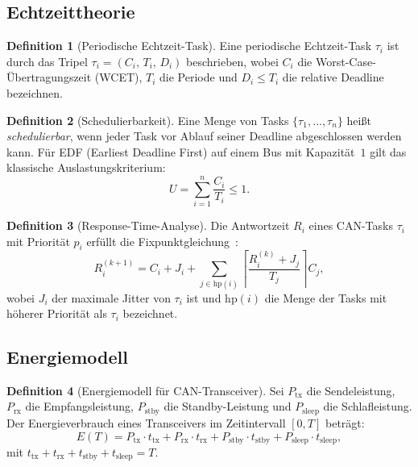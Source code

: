 ﻿\documentclass[a4paper,12pt]{article}
\theoremstyle{definition}
\newtheorem{definition}{Definition}
\begin{document}
\subsection{Echtzeittheorie}

\begin{definition}[Periodische Echtzeit-Task]
Eine periodische Echtzeit-Task $\tau_i$ ist durch das Tripel
$\tau_i = (C_i,\, T_i,\, D_i)$ beschrieben, wobei
$C_i$ die Worst-Case-\"{U}bertragungszeit (WCET),
$T_i$ die Periode und
$D_i \leq T_i$ die relative Deadline bezeichnen.
\end{definition}

\begin{definition}[Schedulierbarkeit]
Eine Menge von Tasks $\{\tau_1, \ldots, \tau_n\}$ hei\ss{}t \emph{schedulierbar},
wenn jeder Task vor Ablauf seiner Deadline abgeschlossen werden kann.
F\"{u}r EDF (Earliest Deadline First) auf einem Bus mit Kapazit\"{a}t~$1$ gilt
das klassische Auslastungskriterium:
\[
    U = \sum_{i=1}^{n} \frac{C_i}{T_i} \leq 1.
\]
\end{definition}

\begin{definition}[Response-Time-Analyse]
Die Antwortzeit $R_i$ eines CAN-Tasks $\tau_i$ mit Priorit\"{a}t $p_i$ erf\"{u}llt die
Fixpunktgleichung~\cite{tindell_can}:
\[
    R_i^{(k+1)}
    = C_i + J_i
      + \sum_{j \in \mathrm{hp}(i)}
        \left\lceil \frac{R_i^{(k)} + J_j}{T_j} \right\rceil C_j,
\]
wobei $J_i$ der maximale Jitter von $\tau_i$ ist und $\mathrm{hp}(i)$ die Menge
der Tasks mit h\"{o}herer Priorit\"{a}t als $\tau_i$ bezeichnet.
\end{definition}

\subsection{Energiemodell}

\begin{definition}[Energiemodell f\"{u}r CAN-Transceiver]
Sei $P_{\mathrm{tx}}$ die Sendeleistung, $P_{\mathrm{rx}}$ die Empfangsleistung,
$P_{\mathrm{stby}}$ die Standby-Leistung und $P_{\mathrm{sleep}}$ die Schlafleistung.
Der Energieverbrauch eines Transceivers im Zeitintervall $[0, T]$ betr\"{a}gt:
\[
    E(T) = P_{\mathrm{tx}} \cdot t_{\mathrm{tx}}
         + P_{\mathrm{rx}} \cdot t_{\mathrm{rx}}
         + P_{\mathrm{stby}} \cdot t_{\mathrm{stby}}
         + P_{\mathrm{sleep}} \cdot t_{\mathrm{sleep}},
\]
mit $t_{\mathrm{tx}} + t_{\mathrm{rx}} + t_{\mathrm{stby}} + t_{\mathrm{sleep}} = T$.
\end{definition}
\end{document}
